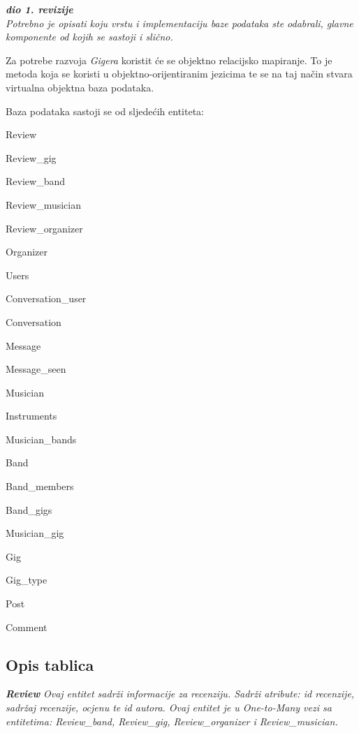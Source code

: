 			\textbf{\textit{dio 1. revizije}}\\
			
		\textit{Potrebno je opisati koju vrstu i implementaciju baze podataka ste odabrali, glavne komponente od kojih se sastoji i slično.}
		
		Za potrebe razvoja \textit{Gigera} koristit će se objektno relacijsko mapiranje. To je metoda koja se koristi u objektno-orijentiranim jezicima te se na taj način stvara virtualna objektna baza podataka.
		
		Baza podataka sastoji se od sljedećih entiteta:
		
		\begin{packed_item}
			\item Review
			\item Review\_gig
			\item Review\_band
			\item Review\_musician
			\item Review\_organizer
			\item Organizer
			\item Users
			\item Conversation\_user
			\item Conversation
			\item Message
			\item Message\_seen
			\item Musician
			\item Instruments
			\item Musician\_bands
			\item Band
			\item Band\_members
			\item Band\_gigs
			\item Musician\_gig
			\item Gig
			\item Gig\_type
			\item Post
			\item Comment
		\end{packed_item}
			
		
		
		\subsection{Opis tablica}


							\textit{\bf Review}
			\textit{Ovaj entitet sadrži informacije za recenziju. Sadrži atribute: id recenzije, sadržaj recenzije, ocjenu te id autora. Ovaj entitet je u \emph{One-to-Many} vezi  sa entitetima: Review\_band, Review\_gig, Review\_organizer i Review\_musician.}

